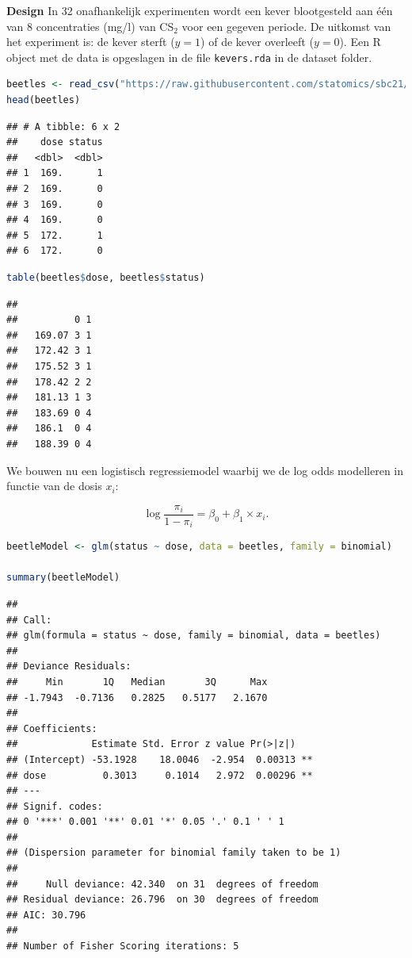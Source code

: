 \documentclass[
  12pt,dutch,coursenotes]{book}
\newcommand{\passthrough}[1]{#1}
\begin{document}
\textbf{Design} In 32 onafhankelijk experimenten wordt een kever blootgesteld aan één van 8 concentraties (mg/l) van CS\(_2\) voor een gegeven periode. De uitkomst van het experiment is: de kever sterft (\(y=1\)) of de kever overleeft (\(y=0\)).
Een R object met de data is opgeslagen in de file \passthrough{\lstinline!kevers.rda!} in de dataset folder.

\begin{lstlisting}[language=R]
beetles <- read_csv("https://raw.githubusercontent.com/statomics/sbc21/master/data/beetles.csv")
head(beetles)
\end{lstlisting}

\begin{lstlisting}
## # A tibble: 6 x 2
##    dose status
##   <dbl>  <dbl>
## 1  169.      1
## 2  169.      0
## 3  169.      0
## 4  169.      0
## 5  172.      1
## 6  172.      0
\end{lstlisting}

\begin{lstlisting}[language=R]
table(beetles$dose, beetles$status)
\end{lstlisting}

\begin{lstlisting}
##         
##          0 1
##   169.07 3 1
##   172.42 3 1
##   175.52 3 1
##   178.42 2 2
##   181.13 1 3
##   183.69 0 4
##   186.1  0 4
##   188.39 0 4
\end{lstlisting}

We bouwen nu een logistisch regressiemodel waarbij we de log odds modelleren in functie van de dosis \(x_i\):

\[\log \frac{\pi_i}{1-\pi_i}=\beta_0+\beta_1 \times x_i.\]

\begin{lstlisting}[language=R]
beetleModel <- glm(status ~ dose, data = beetles, family = binomial)

summary(beetleModel)
\end{lstlisting}

\begin{lstlisting}
## 
## Call:
## glm(formula = status ~ dose, family = binomial, data = beetles)
## 
## Deviance Residuals: 
##     Min       1Q   Median       3Q      Max  
## -1.7943  -0.7136   0.2825   0.5177   2.1670  
## 
## Coefficients:
##             Estimate Std. Error z value Pr(>|z|)   
## (Intercept) -53.1928    18.0046  -2.954  0.00313 **
## dose          0.3013     0.1014   2.972  0.00296 **
## ---
## Signif. codes:  
## 0 '***' 0.001 '**' 0.01 '*' 0.05 '.' 0.1 ' ' 1
## 
## (Dispersion parameter for binomial family taken to be 1)
## 
##     Null deviance: 42.340  on 31  degrees of freedom
## Residual deviance: 26.796  on 30  degrees of freedom
## AIC: 30.796
## 
## Number of Fisher Scoring iterations: 5
\end{lstlisting}
\end{document}
